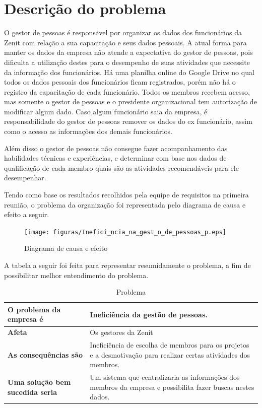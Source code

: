 \section{Descrição do problema}
O gestor de pessoas é responsável por organizar os dados dos funcionários da Zenit com relação a sua capacitação e seus dados pessoais. A atual forma para manter os dados da empresa não atende a expectativa do gestor de pessoas, pois dificulta a utilização destes para o desempenho de suas atividades que necessite da informação dos funcionários. Há uma planilha online do Google Drive no qual todos os dados pessoais dos funcionários ficam registrados, porém não há o registro da capacitação de cada funcionário. Todos os membros recebem acesso, mas somente o gestor de pessoas e o presidente organizacional tem autorização de modificar algum dado. Caso algum funcionário saia da empresa, é responsabilidade do gestor de pessoas remover os dados do ex funcionário, assim como o acesso as informações dos demais funcionários.

Além disso o gestor de pessoas não consegue fazer acompanhamento das habilidades técnicas e experiências, e determinar com base nos dados de qualificação de cada membro quais são as atividades recomendáveis para ele desempenhar.

Tendo como base os resultados recolhidos pela equipe de requisitos na primeira reunião, o problema da organização foi representada pelo  diagrama de causa e efeito a seguir.

\begin{figure}[H]
    \centering
    \label{fishBone}
    \texttt{[image: figuras/Inefici\_ncia\_na\_gest\_o\_de\_pessoas\_p.eps]}
    \caption[Diagrama de causa e efeito]{Diagrama de causa e efeito}
\end{figure}

A tabela a seguir foi feita para representar resumidamente o problema, a fim de possibilitar melhor entendimento do problema.

\begin{table}[H]
    \centering
    \label{descricaoAtividades}
    \caption{Problema}
        \begin{tabular}{|l|p{10cm}|}
        \hline
        \textbf{O problema da empresa é} &Ineficiência da gestão de pessoas.\\
        \hline
        \textbf{Afeta} &Os gestores da Zenit\\
        \hline
        \textbf{As consequências são} &Ineficiência de escolha de membros para os projetos e a desmotivação para realizar certas atividades dos membros.\\
        \hline
        \textbf{Uma solução bem sucedida seria} &Um sistema que centralizaria as informações dos membros da empresa e possibilita fazer buscas nestes dados.\\
        \hline
    \end{tabular}
\end{table}

